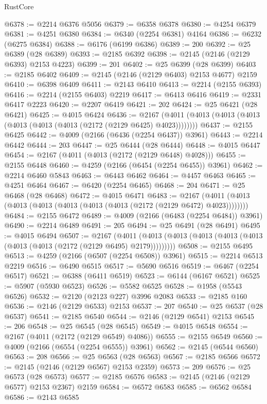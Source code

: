 \begin{lexlean}{RustCore}
\begin{coremodule}
@6378 := @2214 @6376 @5056
@6379 := @6358 @6378
@6380 := @4254 @6379
@6381 := @4251 @6380
@6384 := @6340 (@2254 @6381) @4164
@6386 := @6232 (@6275 @6384)
@6388 := @6176 (@6199 @6386)
@6389 := 200
@6392 := @25 @6389 (@28 @6389)
@6393 := @2185 @6392
@6398 := @2145 (@2146 (@2129 @6393) @2153 @4223)
@6399 := 201
@6402 := @25 @6399 (@28 @6399)
@6403 := @2185 @6402
@6409 := @2145 (@2146 (@2129 @6403) @2153 @4677) @2159
@6410 := @6398 @6409
@6411 := @2143 @6410
@6413 := @2214 (@2155 @6393)
@6416 := @2214 (@2155 @6403) @2219
@6417 := @6413 @6416
@6419 := @2331 @6417 @2223
@6420 := @2207 @6419
@6421 := 202
@6424 := @25 @6421 (@28 @6421)
@6425 := @4015 @6424
@6436 := @2167 (@4011 (@4013 (@4013 (@4013 (@4013 (@4013 (@4013 (@2172 (@2129 @6425) @4023))))))))
@6437 := @2155 @6425
@6442 := @4009 (@2166 (@6436 (@2254 @6437)) @3961)
@6443 := @2214 @6442
@6444 := 203
@6447 := @25 @6444 (@28 @6444)
@6448 := @4015 @6447
@6454 := @2167 (@4011 (@4013 (@2172 (@2129 @6448) @4028)))
@6455 := @2155 @6448
@6460 := @4259 (@2166 (@6454 (@2254 @6455)) @3961)
@6462 := @2214 @6460 @5843
@6463 := @6443 @6462
@6464 := @4457 @6463
@6465 := @4251 @6464
@6467 := @6420 (@2254 @6465)
@6468 := 204
@6471 := @25 @6468 (@28 @6468)
@6472 := @4015 @6471
@6483 := @2167 (@4011 (@4013 (@4013 (@4013 (@4013 (@4013 (@4013 (@2172 (@2129 @6472) @4023))))))))
@6484 := @2155 @6472
@6489 := @4009 (@2166 (@6483 (@2254 @6484)) @3961)
@6490 := @2214 @6489
@6491 := 205
@6494 := @25 @6491 (@28 @6491)
@6495 := @4015 @6494
@6507 := @2167
    (@4011 (@4013 (@4013 (@4013 (@4013 (@4013 (@4013 (@4013 (@2172 (@2129 @6495) @2179)))))))))
@6508 := @2155 @6495
@6513 := @4259 (@2166 (@6507 (@2254 @6508)) @3961)
@6515 := @2214 @6513 @2219
@6516 := @6490 @6515
@6517 := @5690 @6516
@6519 := @6467 (@2254 @6517)
@6521 := @6388 (@6411 @6519)
@6523 := @6144 (@6167 @6521)
@6525 := @5907 (@5930 @6523)
@6526 := @5582 @6525
@6528 := @1958 (@5543 @6526)
@6532 := @2120 (@2123 @227) @3996 @2083
@6533 := @2185 @160
@6536 := @2146 (@2129 @6533) @2153
@6537 := 207
@6540 := @25 @6537 (@28 @6537)
@6541 := @2185 @6540
@6544 := @2146 (@2129 @6541) @2153
@6545 := 206
@6548 := @25 @6545 (@28 @6545)
@6549 := @4015 @6548
@6554 := @2167 (@4011 (@2172 (@2129 @6549) @4086))
@6555 := @2155 @6549
@6560 := @4009 (@2166 (@6554 (@2254 @6555)) @3961)
@6562 := @2145 (@6544 @6560)
@6563 := 208
@6566 := @25 @6563 (@28 @6563)
@6567 := @2185 @6566
@6572 := @2145 (@2146 (@2129 @6567) @2153 @2359)
@6573 := 209
@6576 := @25 @6573 (@28 @6573)
@6577 := @2185 @6576
@6583 := @2145 (@2146 (@2129 @6577) @2153 @2367) @2159
@6584 := @6572 @6583
@6585 := @6562 @6584
@6586 := @2143 @6585

\end{coremodule}
\end{lexlean}
